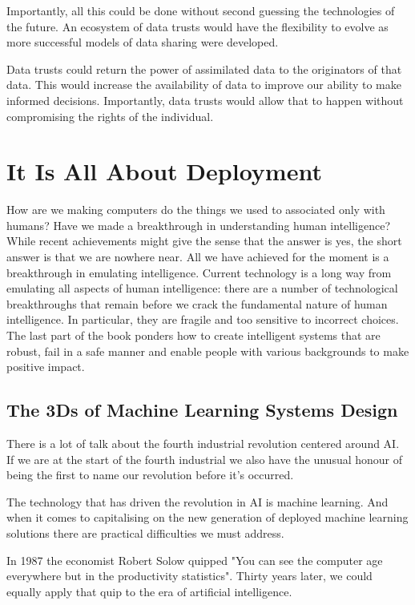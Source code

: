 \documentclass[a4paper]{caesar_book}
\let\oldchapter\chapter
\def\chapter{%
  \setcounter{footnote}{0}%
  \oldchapter
}
\begin{document}
Importantly, all this could be done without second guessing the technologies of the future. An ecosystem of data trusts would have the flexibility to evolve as more successful models of data sharing were developed.

Data trusts could return the power of assimilated data to the originators of that data. This would increase the availability of data to improve our ability to make informed decisions. Importantly, data trusts would allow that to happen without compromising the rights of the individual.

\part{It Is All About Deployment}

How are we making computers do the things we used to associated only with humans? Have we made a breakthrough in understanding human intelligence? While recent achievements might give the sense that the answer is yes, the short answer is that we are nowhere near. All we have achieved for the moment is a breakthrough in emulating intelligence. Current technology is a long way from emulating all aspects of human intelligence: there are a number of technological breakthroughs that remain before we crack the fundamental nature of human intelligence. In particular, they are fragile and too sensitive to incorrect choices. The last part of the book ponders how to create intelligent systems that are robust, fail in a safe manner and enable people with various backgrounds to make positive impact.

\chapter{The 3Ds of Machine Learning Systems Design}
There is a lot of talk about the fourth industrial revolution centered around AI. If we are at the start of the fourth industrial we also have the unusual honour of being the first to name our revolution before it’s occurred.

The technology that has driven the revolution in AI is machine learning. And when it comes to capitalising on the new generation of deployed machine learning solutions there are practical difficulties we must address.

In 1987 the economist Robert Solow quipped "You can see the computer age everywhere but in the productivity statistics". Thirty years later, we could equally apply that quip to the era of artificial intelligence.
\end{document}
